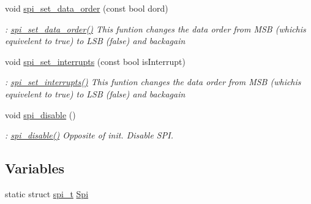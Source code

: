 \begin{DoxyCompactItemize}
void \hyperlink{a00015_a5d5bcfa359b4591e38b5d533d624216e}{spi\-\_\-set\-\_\-data\-\_\-order} (const bool dord)
\begin{DoxyCompactList}\small\item\em \-: \hyperlink{a00015_a5d5bcfa359b4591e38b5d533d624216e}{spi\-\_\-set\-\_\-data\-\_\-order()} This funtion changes the data order from M\-S\-B (whichis equivelent to true) to L\-S\-B (false) and backagain \end{DoxyCompactList}\item 
void \hyperlink{a00015_a61cfa0c122508d59bd38c2046b1e6ebf}{spi\-\_\-set\-\_\-interrupts} (const bool is\-Interrupt)
\begin{DoxyCompactList}\small\item\em \-: \hyperlink{a00015_a61cfa0c122508d59bd38c2046b1e6ebf}{spi\-\_\-set\-\_\-interrupts()} This funtion changes the data order from M\-S\-B (whichis equivelent to true) to L\-S\-B (false) and backagain \end{DoxyCompactList}\item 
void \hyperlink{a00015_a1b20de0da423e7d6da1c99eec9d63216}{spi\-\_\-disable} ()
\begin{DoxyCompactList}\small\item\em \-: \hyperlink{a00015_a1b20de0da423e7d6da1c99eec9d63216}{spi\-\_\-disable()} Opposite of init. Disable S\-P\-I. \end{DoxyCompactList}\end{DoxyCompactItemize}
\subsection*{Variables}
\begin{DoxyCompactItemize}
\item 
static struct \hyperlink{a00008}{spi\-\_\-t} \hyperlink{a00015_acc32e9917e484a47a14e3daccb502db2}{Spi}
\end{DoxyCompactItemize}


